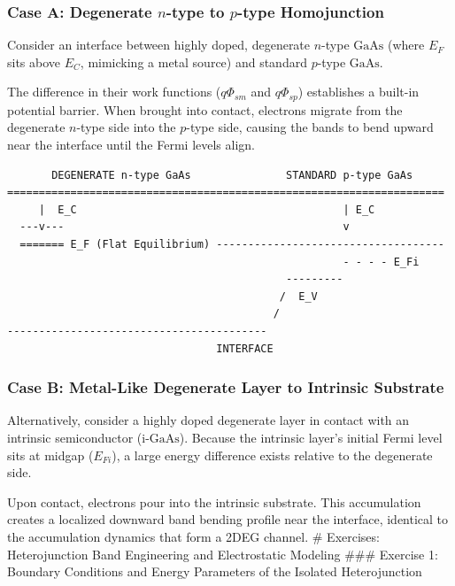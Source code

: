 \documentclass[
]{article}
\begin{document}
\subsubsection{\texorpdfstring{Case A: Degenerate \(n\)-type to
\(p\)-type
Homojunction}{Case A: Degenerate n-type to p-type Homojunction}}\label{case-a-degenerate-n-type-to-p-type-homojunction}

Consider an interface between highly doped, degenerate \(n\)-type
\(\text{GaAs}\) (where \(E_F\) sits above \(E_C\), mimicking a metal
source) and standard \(p\)-type \(\text{GaAs}\).

The difference in their work functions (\(q\Phi_{sm}\) and
\(q\Phi_{sp}\)) establishes a built-in potential barrier. When brought
into contact, electrons migrate from the degenerate \(n\)-type side into
the \(p\)-type side, causing the bands to bend upward near the interface
until the Fermi levels align.

\begin{verbatim}
       DEGENERATE n-type GaAs               STANDARD p-type GaAs
=====================================================================
     |  E_C                                          | E_C
  ---v---                                            v
  ======= E_F (Flat Equilibrium) ------------------------------------
                                                     - - - - E_Fi
                                            ---------
                                           /  E_V
                                          /
-----------------------------------------
                                 INTERFACE
\end{verbatim}

\subsubsection{Case B: Metal-Like Degenerate Layer to Intrinsic
Substrate}\label{case-b-metal-like-degenerate-layer-to-intrinsic-substrate}

Alternatively, consider a highly doped degenerate layer in contact with
an intrinsic semiconductor (\(\text{i-GaAs}\)). Because the intrinsic
layer's initial Fermi level sits at midgap (\(E_{Fi}\)), a large energy
difference exists relative to the degenerate side.

Upon contact, electrons pour into the intrinsic substrate. This
accumulation creates a localized downward band bending profile near the
interface, identical to the accumulation dynamics that form a 2DEG
channel. \# Exercises: Heterojunction Band Engineering and Electrostatic
Modeling \#\#\# Exercise 1: Boundary Conditions and Energy Parameters of
the Isolated Heterojunction
\end{document}
